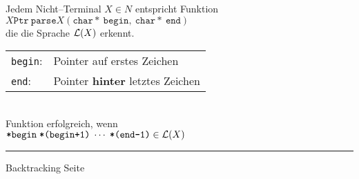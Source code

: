\begin{slide}{}
\begin{enumerate}
      Jedem Nicht--Terminal $X \in N$ entspricht  Funktion \\[0.3cm]
      \hspace*{1.3cm} $X\mathtt{Ptr\ }\mathtt{parse}X(\mathtt{char*\ begin,\ char*\ end})$
      \\[0.3cm]
      die die Sprache ${\cal L}(X)$  erkennt. \\[0.3cm]
        \hspace*{1.3cm} 
      \begin{tabular}{ll}
       \texttt{begin}: & Pointer auf erstes Zeichen   \\
       \texttt{end}:   & Pointer \textbf{hinter} letztes Zeichen  \\
      \end{tabular} \\[0.3cm]
      Funktion erfolgreich, wenn \\[0.3cm]
      \hspace*{1.3cm} $\texttt{*begin}\;\texttt{*(begin+1)}\;\cdots\;\texttt{*(end-1)} \in {\cal L}(X)$
\end{enumerate}

\vspace*{\fill}
\tiny \addtocounter{mypage}{1}
\rule{17cm}{1mm}
Backtracking  \hspace*{\fill} Seite 
\end{slide}


